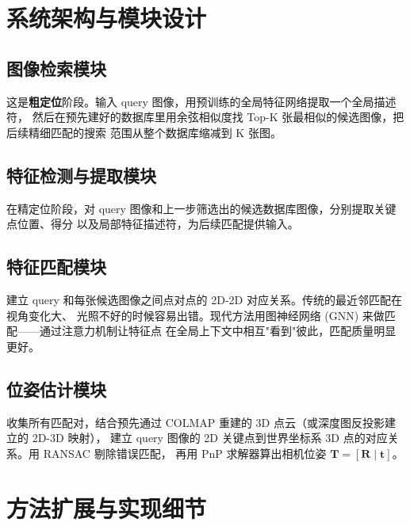 \documentclass[12pt,a4paper]{ctexart}
\begin{document}
\section{系统架构与模块设计}

\subsection{图像检索模块}

这是\textbf{粗定位}阶段。输入 query 图像，用预训练的全局特征网络提取一个全局描述符，
然后在预先建好的数据库里用余弦相似度找 Top-K 张最相似的候选图像，把后续精细匹配的搜索
范围从整个数据库缩减到 K 张图。

\subsection{特征检测与提取模块}

在精定位阶段，对 query 图像和上一步筛选出的候选数据库图像，分别提取关键点位置、得分
以及局部特征描述符，为后续匹配提供输入。

\subsection{特征匹配模块}

建立 query 和每张候选图像之间点对点的 2D-2D 对应关系。传统的最近邻匹配在视角变化大、
光照不好的时候容易出错。现代方法用图神经网络 (GNN) 来做匹配——通过注意力机制让特征点
在全局上下文中相互"看到"彼此，匹配质量明显更好。

\subsection{位姿估计模块}

收集所有匹配对，结合预先通过 COLMAP 重建的 3D 点云（或深度图反投影建立的 2D-3D 映射），
建立 query 图像的 2D 关键点到世界坐标系 3D 点的对应关系。用 RANSAC 剔除错误匹配，
再用 PnP 求解器算出相机位姿 $\mathbf{T} = [\mathbf{R} \mid \mathbf{t}]$。

\section{方法扩展与实现细节}
\end{document}
